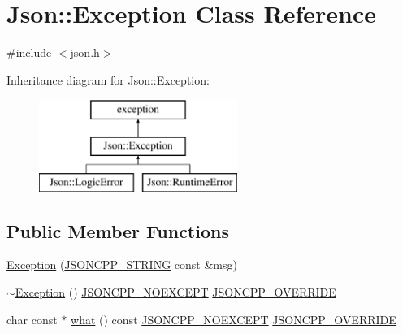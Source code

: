\hypertarget{classJson_1_1Exception}{}\section{Json\+:\+:Exception Class Reference}
\label{classJson_1_1Exception}


{\ttfamily \#include $<$json.\+h$>$}

Inheritance diagram for Json\+:\+:Exception\+:\begin{figure}[H]
\begin{center}
\leavevmode
\includegraphics[height=3.000000cm]{classJson_1_1Exception}
\end{center}
\end{figure}
\subsection*{Public Member Functions}
\begin{DoxyCompactItemize}
\item 
\hyperlink{classJson_1_1Exception_ae764aa42e0755bd4ce9d303e2733fa8f_ae764aa42e0755bd4ce9d303e2733fa8f}{Exception} (\hyperlink{json_8h_a1e723f95759de062585bc4a8fd3fa4be_a1e723f95759de062585bc4a8fd3fa4be}{J\+S\+O\+N\+C\+P\+P\+\_\+\+S\+T\+R\+I\+NG} const \&msg)
\item 
\hyperlink{classJson_1_1Exception_add6af5e0ecdf36f40d7f3554b9786e21_add6af5e0ecdf36f40d7f3554b9786e21}{$\sim$\+Exception} () \hyperlink{json_8h_af8418c6d82d9de6e5f3c739fcf2fe88d_af8418c6d82d9de6e5f3c739fcf2fe88d}{J\+S\+O\+N\+C\+P\+P\+\_\+\+N\+O\+E\+X\+C\+E\+PT} \hyperlink{json_8h_a824d6199c91488107e443226fa6022c5_a824d6199c91488107e443226fa6022c5}{J\+S\+O\+N\+C\+P\+P\+\_\+\+O\+V\+E\+R\+R\+I\+DE}
\item 
char const  $\ast$ \hyperlink{classJson_1_1Exception_a70b7ce35e761fb93e8cd338e04619cd6_a70b7ce35e761fb93e8cd338e04619cd6}{what} () const \hyperlink{json_8h_af8418c6d82d9de6e5f3c739fcf2fe88d_af8418c6d82d9de6e5f3c739fcf2fe88d}{J\+S\+O\+N\+C\+P\+P\+\_\+\+N\+O\+E\+X\+C\+E\+PT} \hyperlink{json_8h_a824d6199c91488107e443226fa6022c5_a824d6199c91488107e443226fa6022c5}{J\+S\+O\+N\+C\+P\+P\+\_\+\+O\+V\+E\+R\+R\+I\+DE}
\end{DoxyCompactItemize}
